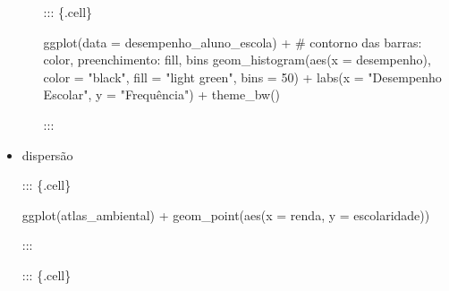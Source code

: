 \documentclass[
  letterpaper,
  DIV=11,
  numbers=noendperiod]{scrreprt}
\newenvironment{Shaded}{\begin{snugshade}}{\end{snugshade}}
\newcommand{\AttributeTok}[1]{\textcolor[rgb]{0.40,0.45,0.13}{#1}}
\newcommand{\CommentTok}[1]{\textcolor[rgb]{0.37,0.37,0.37}{#1}}
\newcommand{\DecValTok}[1]{\textcolor[rgb]{0.68,0.00,0.00}{#1}}
\newcommand{\FunctionTok}[1]{\textcolor[rgb]{0.28,0.35,0.67}{#1}}
\newcommand{\NormalTok}[1]{\textcolor[rgb]{0.00,0.23,0.31}{#1}}
\newcommand{\SpecialCharTok}[1]{\textcolor[rgb]{0.37,0.37,0.37}{#1}}
\newcommand{\StringTok}[1]{\textcolor[rgb]{0.13,0.47,0.30}{#1}}
\begin{document}
\begin{itemize}
\begin{itemize}
    ::: \{.cell\}

\begin{Shaded}
\begin{Highlighting}[]
    \FunctionTok{ggplot}\NormalTok{(}\AttributeTok{data =}\NormalTok{ desempenho\_aluno\_escola) }\SpecialCharTok{+}
        \CommentTok{\# contorno das barras: color, preenchimento: fill, bins}
        \FunctionTok{geom\_histogram}\NormalTok{(}\FunctionTok{aes}\NormalTok{(}\AttributeTok{x =}\NormalTok{ desempenho), }\AttributeTok{color =} \StringTok{"black"}\NormalTok{, }\AttributeTok{fill =} \StringTok{"light green"}\NormalTok{, }\AttributeTok{bins =} \DecValTok{50}\NormalTok{) }\SpecialCharTok{+}
        \FunctionTok{labs}\NormalTok{(}\AttributeTok{x =} \StringTok{"Desempenho Escolar"}\NormalTok{,}
            \AttributeTok{y =} \StringTok{"Frequência"}\NormalTok{) }\SpecialCharTok{+}
        \FunctionTok{theme\_bw}\NormalTok{()}
\end{Highlighting}
\end{Shaded}

    :::
  \end{itemize}
\item
  dispersão

  ::: \{.cell\}

\begin{Shaded}
\begin{Highlighting}[]
\FunctionTok{ggplot}\NormalTok{(atlas\_ambiental) }\SpecialCharTok{+}
    \FunctionTok{geom\_point}\NormalTok{(}\FunctionTok{aes}\NormalTok{(}\AttributeTok{x =}\NormalTok{ renda, }\AttributeTok{y =}\NormalTok{ escolaridade))    }
\end{Highlighting}
\end{Shaded}

  :::

  ::: \{.cell\}


\end{itemize}
\end{document}
